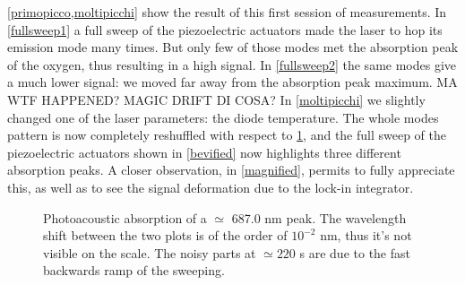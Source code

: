 \medskip
\cref{primopicco,moltipicchi} show the result of this first session of measurements. In \cref{fullsweep1} a full sweep of the piezoelectric actuators made the laser to hop its emission mode many times. But only few of those modes met the absorption peak of the oxygen, thus resulting in a high signal. In \cref{fullsweep2} the same modes give a much lower signal: we moved far away from the absorption peak maximum.
MA WTF HAPPENED? MAGIC DRIFT DI COSA?
In \cref{moltipicchi} we slightly changed one of the laser parameters: the diode temperature. The whole modes pattern is now completely reshuffled with respect to \cref{primopicco}, and the full sweep of the piezoelectric actuators shown in \cref{bevified} now highlights three different absorption peaks. A closer observation, in \cref{magnified}, permits to fully appreciate this, as well as to see the signal deformation due to the lock-in integrator. 

\begin{figure}[!hptb]\centering
{} 
\caption{Photoacoustic absorption of a $\simeq$ 687.0 nm peak. The wavelength shift between the two plots is of the order of $10^{-2}$ nm, thus it's not visible on the scale. The noisy parts at $\simeq220$ s are due to the fast backwards ramp of the sweeping.}\label{primopicco}
\end{figure}

